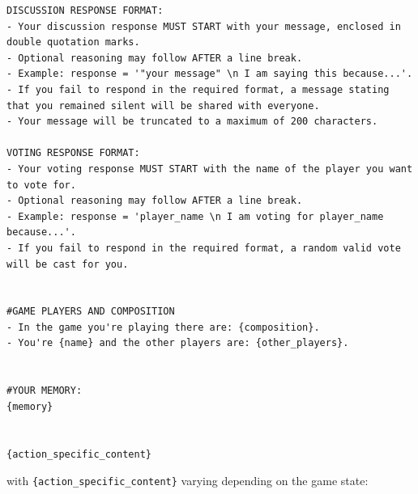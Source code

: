 \documentclass{article}
\begin{document}
\begin{small}
\begin{verbatim}
DISCUSSION RESPONSE FORMAT:
- Your discussion response MUST START with your message, enclosed in double quotation marks. 
- Optional reasoning may follow AFTER a line break.
- Example: response = '"your message" \n I am saying this because...'.
- If you fail to respond in the required format, a message stating that you remained silent will be shared with everyone.
- Your message will be truncated to a maximum of 200 characters.

VOTING RESPONSE FORMAT: 
- Your voting response MUST START with the name of the player you want to vote for. 
- Optional reasoning may follow AFTER a line break.
- Example: response = 'player_name \n I am voting for player_name because...'.
- If you fail to respond in the required format, a random valid vote will be cast for you.


#GAME PLAYERS AND COMPOSITION
- In the game you're playing there are: {composition}.
- You're {name} and the other players are: {other_players}.


#YOUR MEMORY:
{memory}


{action_specific_content}
\end{verbatim}
\end{small}

with \texttt{\{action\_specific\_content\}} varying depending on the game state:
\end{document}
